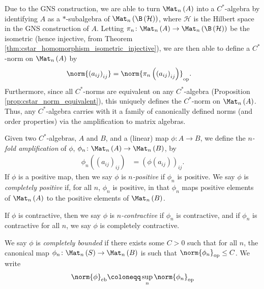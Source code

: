 Due to the GNS construction, we are able to turn $\Mat_n\left( A \right)$ into a $C^{\ast}$-algebra by identifying $A$ as a $\ast$-subalgebra of $\Mat_n\left( \B\left( \mathcal{H} \right) \right)$, where $\mathcal{H}$ is the Hilbert space in the GNS construction of $A$. Letting $\pi_{n}\colon \Mat_n\left( A \right)\rightarrow \Mat_n\left( \B\left( \mathcal{H} \right) \right)$ be the isometric (hence injective, from Theorem \ref{thm:cstar_homomorphism_isometric_injective}), we are then able to define a $C^{\ast}$-norm on $\Mat_n\left( A \right)$ by
\begin{align*}
  \norm{\left( a_{ij} \right)_{ij}} &= \norm{\pi_n\left( \left( a_{ij} \right)_{ij} \right)}_{\op}.
\end{align*}
Furthermore, since all $C^{\ast}$-norms are equivalent on any $C^{\ast}$-algebra (Proposition \ref{prop:cstar_norm_equivalent}), this uniquely defines the $C^{\ast}$-norm on $\Mat_n\left( A \right)$. Thus, any $C^{\ast}$-algebra carries with it a family of canonically defined norms (and order properties) via the amplification to matrix algebras.
\begin{definition}
  Given two $C^{\ast}$-algebras, $A$ and $B$, and a (linear) map $\phi\colon A\rightarrow B$, we define the \textit{$n$-fold amplification} of $\phi$, $\phi_n\colon \Mat_n\left( A \right)\rightarrow \Mat_n\left( B \right)$, by
  \begin{align*}
    \phi_n\left( \left( a_{ij} \right)_{ij} \right) &= \left( \phi\left( a_{ij} \right) \right)_{ij}.
  \end{align*}
  If $\phi$ is a positive map, then we say $\phi$ is \textit{$n$-positive} if $\phi_n$ is positive. We say $\phi$ is \textit{completely positive} if, for all $n$, $\phi_n$ is positive, in that $\phi_n$ maps positive elements of $\Mat_n\left( A \right)$ to the positive elements of $\Mat_n\left( B \right)$.\newline

  If $\phi$ is contractive, then we say $\phi$ is \textit{$n$-contractive} if $\phi_n$ is contractive, and if $\phi_n$ is contractive for all $n$, we say $\phi$ is completely contractive.\newline

  We say $\phi$ is \textit{completely bounded} if there exists some $C > 0$ such that for all $n$, the canonical map $\phi_n\colon \Mat_n\left( S \right)\rightarrow \Mat_n\left( B \right)$ is such that $\norm{\phi_n}_{\op}\leq C$. We write
  \begin{align*}
    \norm{\phi}_{\cb}\coloneq \sup_{n} \norm{\phi_n}_{\op}
  \end{align*}
\end{definition}
